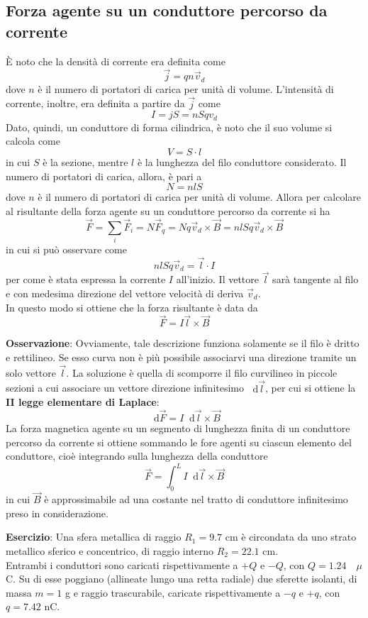 \documentclass[a4paper]{extarticle}
\newcommand\dif{\mathop{}\!\mathrm{d}}
\begin{document}
\vspace{1em}
\subsection{Forza agente su un conduttore percorso da corrente}
È noto che la densità di corrente era definita come
\[\vec j = q n \vec{v}_d\]
dove $n$ è il numero di portatori di carica per unità di volume. L'intensità di corrente, inoltre, era definita a partire da $\vec j$ come
\[I = j S = nSq v_d\]
Dato, quindi, un conduttore di forma cilindrica, è noto che il suo volume si calcola come
\[V = S \cdot l\]
in cui $S$ è la sezione, mentre $l$ è la lunghezza del filo conduttore considerato. Il numero di portatori di carica, allora, è pari a
\[N=n l S\]
dove $n$ è il numero di portatori di carica per unità di volume. Allora per calcolare al risultante della forza agente su un conduttore percorso da corrente si ha
\[\vec F = \sum_i \vec{F}_i = N \vec{F}_q = N q \vec{v}_d \times \vec B = nl S q \vec{v}_d \times \vec B\]
in cui si può osservare come
\[nl Sq \vec{v}_d = \vec l \cdot I\]
per come è stata espressa la corrente $I$ all'inizio. Il vettore $\vec l$ sarà tangente al filo e con medesima direzione del vettore velocità di deriva $\vec{v}_d$.\\
In questo modo si ottiene che la forza risultante è data da
\[\boxed{\vec F = I \vec l \times \vec B}\]

\vspace{1em}
\noindent
\textbf{Osservazione}: Ovviamente, tale descrizione funziona solamente se il filo è dritto e rettilineo. Se esso curva non è più possibile associarvi una direzione tramite un solo vettore $\vec l$. La soluzione è quella di scomporre il filo curvilineo in piccole sezioni a cui associare un vettore direzione infinitesimo $\dif \vec l$, per cui si ottiene la \textbf{II legge elementare di Laplace}:
\[\boxed{\dif \vec F = I \dif \vec l \times \vec B}\]
La forza magnetica agente su un segmento di lunghezza finita di un conduttore percorso da corrente si ottiene sommando le fore agenti su ciascun elemento del conduttore, cioè integrando sulla lunghezza della conduttore
\[\vec F = \int_0^L I \dif \vec l \times \vec B\]
in cui $\vec B$ è approssimabile ad una costante nel tratto di conduttore infinitesimo preso in considerazione.

\vspace{2em}
\noindent
\textbf{Esercizio}: Una sfera metallica di raggio $R_1=9.7$ cm è circondata da uno strato metallico sferico e concentrico, di raggio interno $R_2=22.1$ cm.\\
Entrambi i conduttori sono caricati rispettivamente a $+Q$ e $-Q$, con $Q=1.24 \hspace{1em} \mu$C. Su di esse poggiano (allineate lungo una retta radiale) due sferette isolanti, di massa $m=1$ g e raggio trascurabile, caricate rispettivamente a $-q$ e $+q$, con $q=7.42$ nC.
\end{document}
